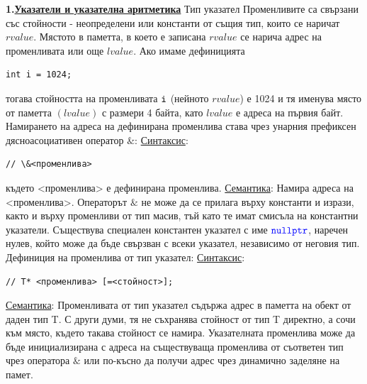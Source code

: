 \documentclass{article}
\begin{document}
\textbf{1.\underline{Указатели и указателна аритметика}} \newline\newline
Тип указател \newline
Променливите са свързани със стойности - неопределени или константи от същия тип, които се наричат $rvalue$. Мястото в паметта,
в което е записана $rvalue$ се нарича адрес на променливата или още $lvalue$. Ако имаме дефиницията
\begin{lstlisting}[style=cpp]
int i = 1024;
\end{lstlisting} тогава стойността на променливата $\textcolor{black}{\texttt{i}}$ (нейното $rvalue$) е 1024 и тя именува място от паметта $(lvalue)$ с размери
4 байта, като $lvalue$ е адреса на първия байт. Намирането на адреса на дефинирана променлива става чрез унарния префиксен дясноасоциативен оператор $\&$:
\newline\newline
\underline{Синтаксис}:
\begin{lstlisting}[style=cpp]
// \&<променлива>
\end{lstlisting}
където <променлива> е дефинирана променлива. \newline\newline
\underline{Семантика}:
Намира адреса на <променлива>. \newline\newline
Операторът $\&$ не може да се прилага върху константи и изрази, както и върху променливи от тип масив, тъй като те имат смисъла
на константни указатели. \newline\newline
Съществува специален константен указател с име $\textcolor{blue}{\texttt{nullptr}}$, наречен нулев, който може да бъде свързван с всеки указател, независимо
от неговия тип. \newline\newline
Дефиниция на променлива от тип указател: \newline\newline
\underline{Синтаксис}:
\begin{lstlisting}[style=cpp]
// T* <променлива> [=<стойност>];
\end{lstlisting}
\underline{Семантика}:
Променливата от тип указател съдържа адрес в паметта на обект от даден тип T. С други думи, тя не съхранява стойност от тип T директно, а
сочи към място, където такава стойност се намира. Указателната променлива може да бъде инициализирана с адреса на съществуваща променлива от
съответен тип чрез оператора $\&$ или по-късно да получи адрес чрез динамично заделяне на памет. \newline\newline
\end{document}
